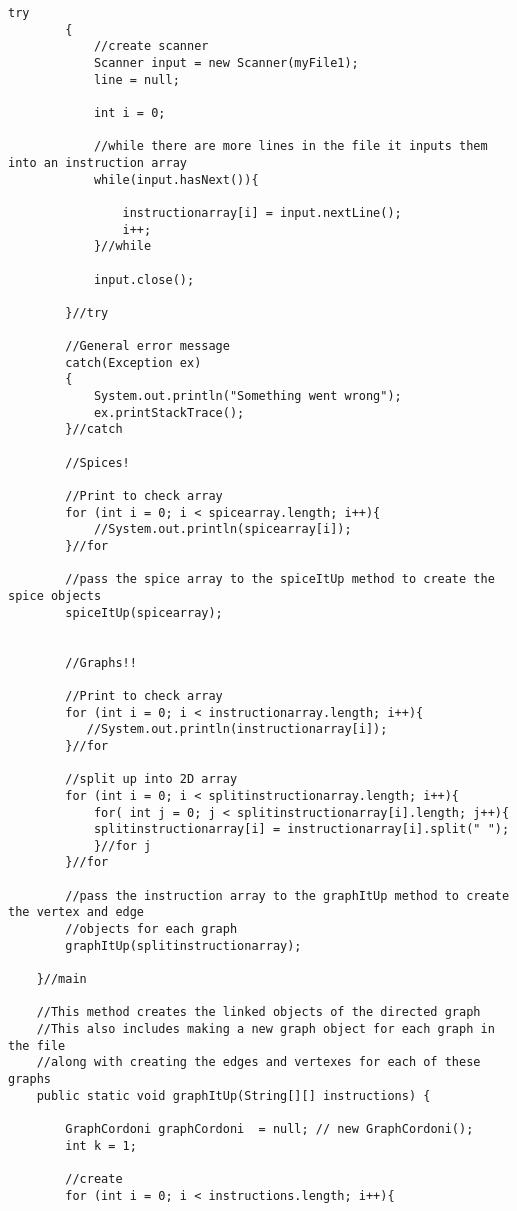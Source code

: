 \documentclass[letterpaper, 10pt,DIV=13]{scrartcl}
\numberwithin{equation}{section} %
\numberwithin{figure}{section} %
\numberwithin{table}{section} %
\begin{document}
\begin{lstlisting}[frame=single, ]
        try
        {
            //create scanner
            Scanner input = new Scanner(myFile1);
            line = null;
            
            int i = 0;

            //while there are more lines in the file it inputs them into an instruction array
            while(input.hasNext()){

                instructionarray[i] = input.nextLine();
                i++;
            }//while
  
            input.close();  

        }//try
        
        //General error message
        catch(Exception ex)
        {
            System.out.println("Something went wrong");
            ex.printStackTrace();
        }//catch

        //Spices!

        //Print to check array 
        for (int i = 0; i < spicearray.length; i++){
            //System.out.println(spicearray[i]);
        }//for

        //pass the spice array to the spiceItUp method to create the spice objects
        spiceItUp(spicearray);


        //Graphs!!

        //Print to check array 
        for (int i = 0; i < instructionarray.length; i++){
           //System.out.println(instructionarray[i]);
        }//for

        //split up into 2D array 
        for (int i = 0; i < splitinstructionarray.length; i++){
            for( int j = 0; j < splitinstructionarray[i].length; j++){
            splitinstructionarray[i] = instructionarray[i].split(" ");
            }//for j 
        }//for

        //pass the instruction array to the graphItUp method to create the vertex and edge 
        //objects for each graph
        graphItUp(splitinstructionarray);

    }//main

    //This method creates the linked objects of the directed graph
    //This also includes making a new graph object for each graph in the file
    //along with creating the edges and vertexes for each of these graphs
    public static void graphItUp(String[][] instructions) {

        GraphCordoni graphCordoni  = null; // new GraphCordoni();
        int k = 1;

        //create 
        for (int i = 0; i < instructions.length; i++){    
            

\end{lstlisting}
\end{document}
